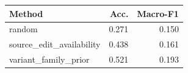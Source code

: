 \begin{tabular}{lrr}
\toprule
Method & Acc. & Macro-F1 \\
\midrule
random & 0.271 & 0.150 \\
source\_edit\_availability & 0.438 & 0.161 \\
variant\_family\_prior & 0.521 & 0.193 \\
\bottomrule
\end{tabular}
